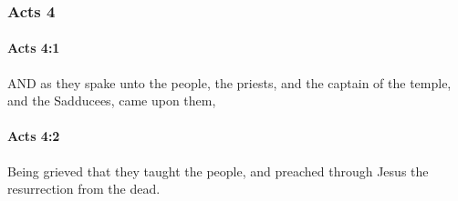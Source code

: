 	\subsubsection{Acts 4} %
		\label{ACTS-4}
		
		\paragraph{Acts 4:1} %
			\label{ACTS-4-1}

			AND as they spake unto the people, the priests, and the captain of the temple, and the Sadducees, came upon them,

			\begin{framed}
			\scriptsize
				\begin{compactdesc}
					\item[SBLG] 
				\end{compactdesc}
			\end{framed}

		\paragraph{Acts 4:2} %
			\label{ACTS-4-2}

			Being grieved that they taught the people, and preached through Jesus the resurrection from the dead.

